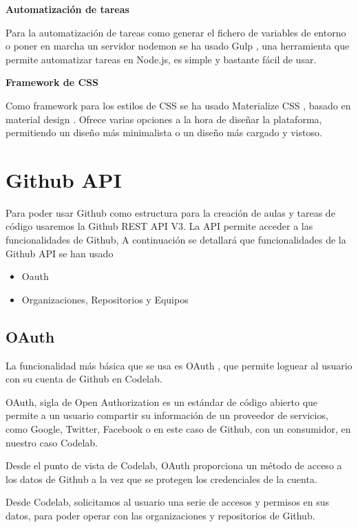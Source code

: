 {\bf Automatización de tareas}

Para la automatización de tareas como generar el fichero de variables de entorno o poner en marcha un servidor nodemon se ha usado Gulp \cite{B2}, una herramienta que permite automatizar tareas en Node.js, es simple y bastante fácil de usar.

{\bf Framework de CSS}

Como framework para los estilos de CSS se ha usado Materialize CSS \cite{B19}, basado en material design \cite{b16}. Ofrece varias opciones a la hora de diseñar la plataforma, permitiendo un diseño más minimalista o un diseño más cargado y vistoso.

\section{Github API}
\label{3:sec2}

Para poder usar Github como estructura para la creación de aulas y tareas de código usaremos la Github REST API V3.
La API permite acceder a las funcionalidades de Github, A continuación se detallará que funcionalidades de la Github API se han usado

\begin{itemize}
  \item Oauth
  \item Organizaciones, Repositorios y Equipos
\end{itemize}

\subsection{OAuth}
\label{3:2:1}

La funcionalidad más básica que se usa es OAuth \cite{B17}, que permite loguear al usuario con su cuenta de Github en
Codelab.

OAuth, sigla de Open Authorization es un estándar de código abierto que permite a un usuario compartir su información de un proveedor de servicios, como Google, Twitter, Facebook o en este caso de Github, con un consumidor, en nuestro caso Codelab.

Desde el punto de vista de Codelab, OAuth proporciona un método de acceso a los datos de Github a la vez que se protegen los credenciales de la cuenta.

Desde Codelab, solicitamos al usuario una serie de accesos y permisos en sus datos, para poder operar con las organizaciones y repositorios de Github.

